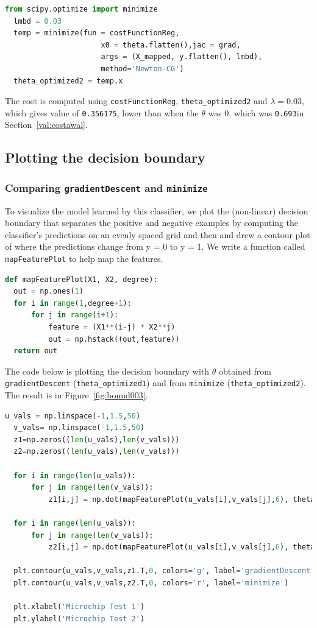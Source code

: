 \documentclass[12pt]{article}
\begin{document}
\begin{lstlisting}[language=Python]
  from scipy.optimize import minimize
  lmbd = 0.03
  temp = minimize(fun = costFunctionReg, 
                      x0 = theta.flatten(),jac = grad, 
                      args = (X_mapped, y.flatten(), lmbd), 
                      method='Newton-CG')
  theta_optimized2 = temp.x
\end{lstlisting}

The cost is computed using \texttt{costFunctionReg}, \verb|theta_optimized2| and $\lambda = 0.03$, which gives value of \texttt{0.356175}, lower than when the $\theta$ was 0, which was \texttt{0.693}in Section~\ref{val:costawal}.

\subsection{Plotting the decision boundary}

\subsubsection{Comparing \texttt{gradientDescent} and \texttt{minimize}}

To visualize the model learned by this classifier, we plot the (non-linear) decision boundary that separates the positive and negative examples by computing the classifier’s predictions on an evenly spaced grid and then and drew a contour plot of where the predictions change from y = 0 to y = 1. We write a function called \texttt{mapFeaturePlot} to help map the features. 

\begin{lstlisting}[language=Python]
  def mapFeaturePlot(X1, X2, degree):
  out = np.ones(1)
  for i in range(1,degree+1):
      for j in range(i+1):
          feature = (X1**(i-j) * X2**j)
          out = np.hstack((out,feature))
  return out
\end{lstlisting}

The code below is plotting the decision boundary with $\theta$ obtained from \texttt{gradientDescent} (\verb|theta_optimized1|) and from \texttt{minimize} (\verb|theta_optimized2|). The result is in Figure~\ref{fig:bound003}. 

\begin{lstlisting}[language=Python]
  u_vals = np.linspace(-1,1.5,50)
  v_vals= np.linspace(-1,1.5,50)
  z1=np.zeros((len(u_vals),len(v_vals)))
  z2=np.zeros((len(u_vals),len(v_vals)))
  
  for i in range(len(u_vals)):
      for j in range(len(v_vals)):
          z1[i,j] = np.dot(mapFeaturePlot(u_vals[i],v_vals[j],6), theta_optimized1)
  
  for i in range(len(u_vals)):
      for j in range(len(v_vals)):
          z2[i,j] = np.dot(mapFeaturePlot(u_vals[i],v_vals[j],6), theta_optimized2.reshape(len(theta_optimized2),1))
  
  plt.contour(u_vals,v_vals,z1.T,0, colors='g', label='gradientDescent')
  plt.contour(u_vals,v_vals,z2.T,0, colors='r', label='minimize')
  
  plt.xlabel('Microchip Test 1')
  plt.ylabel('Microchip Test 2')
\end{lstlisting}
\end{document}
